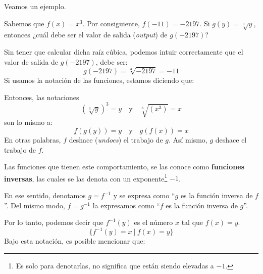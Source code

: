 \documentclass[12pt]{article}
\begin{document}
Veamos un ejemplo.

Sabemos que $f(x) = x^{3}$. Por consiguiente, $f(-11) = -2197$. Si $g(y) = \sqrt[3]{y}$, entonces ¿cuál debe ser el valor de salida (\textit{output}) de $g(-2197)$?

Sin tener que calcular dicha raíz cúbica, podemos intuir correctamente que el valor de salida de $g(-2197)$, debe ser:
\[g(-2197) = \sqrt[3]{-2197} = -11\]
Si usamos la notación de las funciones, estamos diciendo que:

\begin{figure}[hbt!]
\centering


\end{figure}

Entonces, las notaciones
\[(\sqrt[3]{y})^{3} = y \quad \text{y} \quad \sqrt[3]{(x^{3})} = x\]
son lo mismo a:
\[f(g(y)) = y \quad \text{y} \quad g(f(x)) = x\]
En otras palabras, $f$ deshace (\textit{undoes}) el trabajo de $g$. Así mismo, $g$ deshace el trabajo de $f$.

Las funciones que tienen este comportamiento, se las conoce como \textbf{funciones inversas}, las cuales se las denota con un exponente\footnote{Es solo para denotarlas, no significa que están siendo elevadas a $-1$.} $-1$.

En ese sentido, denotamos $g = f^{-1}$ y se expresa como ``$g$ es la función inversa de $f$''. Del mismo modo, $f = g^{-1}$ la expresamos como ``$f$ es la función inversa de $g$''.

Por lo tanto, podemos decir que $f^{-1}(y)$ es el número $x$ tal que $f(x) = y$.
\[\{f^{-1}(y) = x \ | \ f(x) = y\}\]
Bajo esta notación, es posible mencionar que:

\begin{figure}[hbt!]
\centering


\end{figure}
\end{document}
